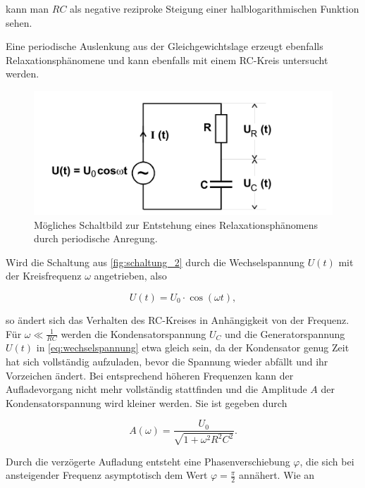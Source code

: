 kann man $RC$ als negative reziproke Steigung einer halblogarithmischen Funktion sehen.\cite{V353}

Eine periodische Auslenkung aus der Gleichgewichtslage erzeugt ebenfalls Relaxationsphänomene und kann ebenfalls mit einem RC-Kreis untersucht werden. 

\begin{figure}
    \centering
    \includegraphics[width=\textwidth/2]{images/schaltung_2.png}
    \caption{Mögliches Schaltbild zur Entstehung eines Relaxationsphänomens durch periodische Anregung.  \cite{V353}}
    \label{fig:schaltung_2}
\end{figure}

Wird die Schaltung aus \autoref{fig:schaltung_2} durch die Wechselspannung $U (t)$ mit der Kreisfrequenz $\omega$ angetrieben, also 

\begin{equation}
    \label{eq:wechselspannung}
    U (t) = U_0 \cdot \cos \left(\omega t \right),
\end{equation}

so ändert sich das Verhalten des RC-Kreises in Anhängigkeit von der Frequenz. Für $\omega \ll \frac{1}{RC}$ werden die Kondensatorspannung $U_C$ und die Generatorspannung $U (t)$ in \autoref{eq:wechselspannung} etwa gleich sein, da der Kondensator genug Zeit hat sich vollständig aufzuladen, bevor die Spannung wieder abfällt und ihr Vorzeichen ändert. Bei entsprechend höheren Frequenzen kann der Aufladevorgang nicht mehr vollständig stattfinden und die Amplitude $A$ der Kondensatorspannung wird kleiner werden. Sie ist gegeben durch

\begin{equation}
    \label{eq:amplitude}
    A (\omega) = \frac{U_0}{\sqrt{1 + \omega^2 R^2 C^2}}.
\end{equation}

Durch die verzögerte Aufladung entsteht eine Phasenverschiebung $\varphi$, die sich bei ansteigender Frequenz asymptotisch dem Wert $\varphi = \frac{\pi}{2}$ annähert. Wie an

